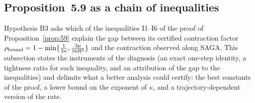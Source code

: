 \subsection{Proposition~5.9 as a chain of inequalities}\label{sec:th-B3}

Hypothesis B3 asks which of the inequalities I1--I6 of the proof of Proposition~\ref{prop:59} explain the gap between
its certified contraction factor $\rho_{\rm bound}=1-\min\{\frac1{3n},\frac{3\mu}{16R^2}\}$ and the contraction observed
along SAGA. This subsection states the instruments of the diagnosis (an exact one-step identity, a tightness ratio for
each inequality, and an attribution of the gap to the inequalities) and delimits what a better analysis could certify:
the best constants of the proof, a lower bound on the exponent of $\kappa$, and a trajectory-dependent version of the
rate.

